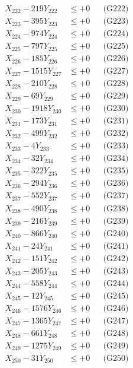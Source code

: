 \documentclass[a4paper,10pt]{article}
\begin{document}
{\begin{align}
X_{222} - 219Y_{222} &\leq +0 && \text{(G222)} \\
X_{223} - 395Y_{223} &\leq +0 && \text{(G223)} \\
X_{224} - 974Y_{224} &\leq +0 && \text{(G224)} \\
X_{225} - 797Y_{225} &\leq +0 && \text{(G225)} \\
X_{226} - 185Y_{226} &\leq +0 && \text{(G226)} \\
X_{227} - 1515Y_{227} &\leq +0 && \text{(G227)} \\
X_{228} - 210Y_{228} &\leq +0 && \text{(G228)} \\
X_{229} - 69Y_{229} &\leq +0 && \text{(G229)} \\
X_{230} - 1918Y_{230} &\leq +0 && \text{(G230)} \\
\allowbreak
X_{231} - 173Y_{231} &\leq +0 && \text{(G231)} \\
X_{232} - 499Y_{232} &\leq +0 && \text{(G232)} \\
X_{233} - 4Y_{233} &\leq +0 && \text{(G233)} \\
X_{234} - 32Y_{234} &\leq +0 && \text{(G234)} \\
X_{235} - 322Y_{235} &\leq +0 && \text{(G235)} \\
X_{236} - 294Y_{236} &\leq +0 && \text{(G236)} \\
X_{237} - 552Y_{237} &\leq +0 && \text{(G237)} \\
X_{238} - 490Y_{238} &\leq +0 && \text{(G238)} \\
X_{239} - 216Y_{239} &\leq +0 && \text{(G239)} \\
X_{240} - 866Y_{240} &\leq +0 && \text{(G240)} \\
\allowbreak
X_{241} - 24Y_{241} &\leq +0 && \text{(G241)} \\
X_{242} - 151Y_{242} &\leq +0 && \text{(G242)} \\
X_{243} - 205Y_{243} &\leq +0 && \text{(G243)} \\
X_{244} - 558Y_{244} &\leq +0 && \text{(G244)} \\
X_{245} - 12Y_{245} &\leq +0 && \text{(G245)} \\
X_{246} - 1576Y_{246} &\leq +0 && \text{(G246)} \\
X_{247} - 1365Y_{247} &\leq +0 && \text{(G247)} \\
X_{248} - 661Y_{248} &\leq +0 && \text{(G248)} \\
X_{249} - 1275Y_{249} &\leq +0 && \text{(G249)} \\
X_{250} - 31Y_{250} &\leq +0 && \text{(G250)} \\

\end{align}}
\end{document}
